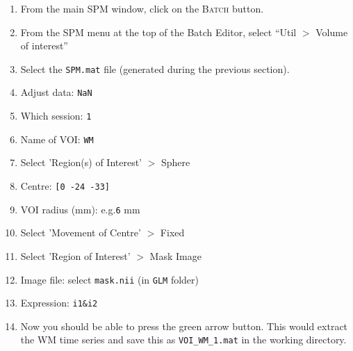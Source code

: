 \begin{enumerate}
 \item From the main SPM window, click on the \textsc{Batch} button.
 \item From the SPM menu at the top of the Batch Editor, select ``Util $>$ Volume of interest''
 \item Select the \texttt{SPM.mat} file (generated during the previous section).
 \item Adjust data: \texttt{NaN}
 \item Which session: \texttt{1}
 \item Name of VOI: \texttt{WM}
 \item Select 'Region(s) of Interest' $>$ Sphere
 \item Centre: \texttt{[0 -24 -33]}
 \item VOI radius (mm): e.g.\texttt{6} mm
 \item Select 'Movement of Centre' $>$ Fixed
 \item Select 'Region of Interest' $>$ Mask Image
 \item Image file: select \texttt{mask.nii} (in \texttt{GLM} folder)
 \item Expression: \texttt{i1\&i2}
 \item Now you should be able to press the green arrow button. This would extract the WM time series and save this as  \texttt{VOI\_WM\_1.mat} in the working directory.
\end{enumerate}

